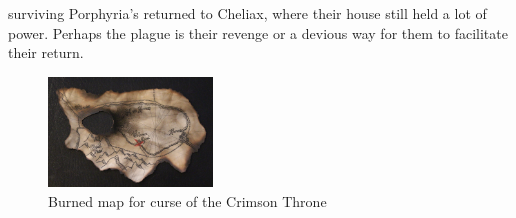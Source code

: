 surviving Porphyria's returned to Cheliax, where their house still held a lot of power. Perhaps the plague is their revenge or a devious way for them to facilitate their return. \\

\begin{figure}[h]
	\centering
	\includegraphics[width=0.39\textwidth]{images/Burned-map-for-curse-of-the-Crimson-Throne-503803899.jpg}
	\caption{Burned map for curse of the Crimson Throne}
	\label{fig:Burned-map-for-curse-of-the-Crimson-Throne-503803899}
\end{figure}

